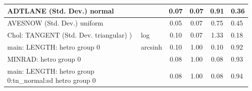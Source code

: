 \begin{table}
\begin{center}
\begin{tabular}{|l|l|c|c|c|l|}
			\hline
			ADTLANE (Std. Dev.) normal &  & 0.07 & 0.07 & 0.91 & 0.36 \\
			\hline
			AVESNOW (Std. Dev.) uniform &  & 0.05 & 0.07 & 0.75 & 0.45 \\
			\hline
			 Chol: TANGENT (Std. Dev. triangular) ) & log & 0.10 & 0.07 & 1.33 & 0.18 \\
			\hline
			main: LENGTH: hetro group 0 & arcsinh & 0.10 & 1.00 & 0.10 & 0.92 \\
			\hline
			MINRAD: hetro group 0 &  & 0.08 & 1.00 & 0.08 & 0.93 \\
			\hline
			main: LENGTH: hetro group 0:tn_normal:sd  hetro group 0 &  & 0.08 & 1.00 & 0.08 & 0.94 \\
			\hline
		\end{tabular}
	\end{center}
\end{table}